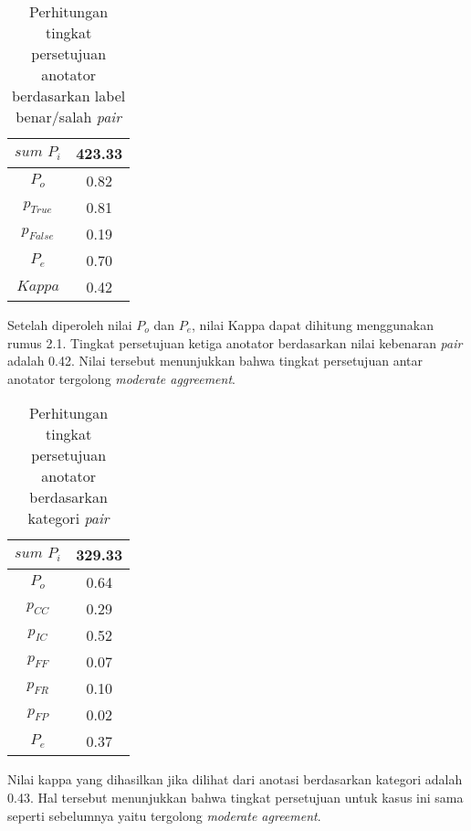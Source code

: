 \begin{table}
  \centering
  \caption{Perhitungan tingkat persetujuan anotator berdasarkan label benar/salah \textit{pair}}
  \label{table:pair-kappa}
  \begin{tabular}{|c|c|}
  \hline
  $sum\,\,P_i$ & 423.33 \\ \hline
  $P_o$ & 0.82 \\ \hline
  $p_{True}$ & 0.81 \\ \hline
  $p_{False}$ & 0.19 \\ \hline
  $P_e$ & 0.70 \\ \hline
  $Kappa$ & 0.42 \\ \hline
  \end{tabular} 
\end{table}

\noindent Setelah diperoleh nilai $P_o$ dan $P_e$, nilai Kappa dapat dihitung menggunakan rumus 2.1. Tingkat persetujuan ketiga anotator berdasarkan nilai kebenaran \textit{pair} adalah 0.42. Nilai tersebut menunjukkan bahwa tingkat persetujuan antar anotator tergolong \textit{moderate aggreement}.

\begin{table}
  \centering
  \caption{Perhitungan tingkat persetujuan anotator berdasarkan kategori \textit{pair}}
  \label{table:pair-kappa2}
  \begin{tabular}{|c|c|}
  \hline
  $sum\,\,P_i$ & 329.33 \\ \hline
  $P_o$ & 0.64 \\ \hline
  $p_{CC}$ & 0.29 \\ \hline
  $p_{IC}$ & 0.52 \\ \hline
  $p_{FF}$ & 0.07 \\ \hline
  $p_{FR}$ & 0.10 \\ \hline
  $p_{FP}$ & 0.02 \\ \hline
  $P_e$ & 0.37 \\ \hline
  \end{tabular} 
\end{table}

\noindent Nilai kappa yang dihasilkan jika dilihat dari anotasi berdasarkan kategori adalah 0.43. Hal tersebut menunjukkan bahwa tingkat persetujuan untuk kasus ini sama seperti sebelumnya yaitu tergolong \textit{moderate agreement}.

